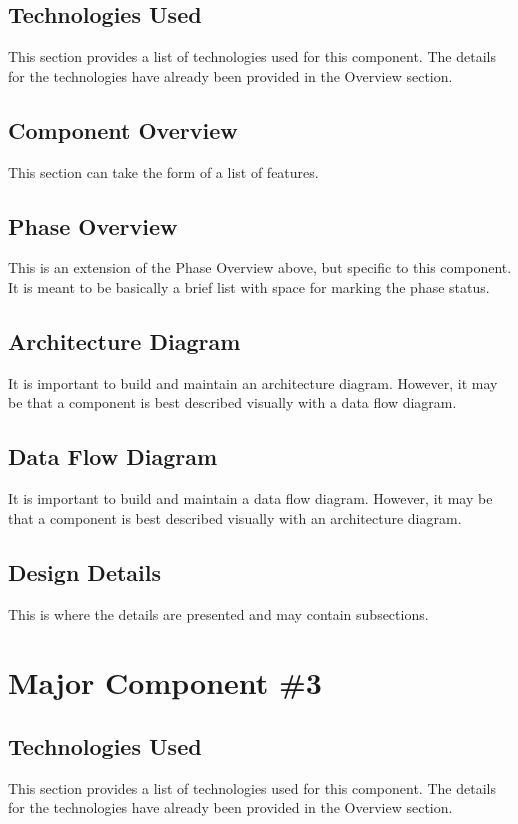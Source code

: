 \subsection{Technologies  Used}
This section provides a list of technologies used for this component.  The details 
for the technologies have already been provided in the Overview section. 

\subsection{Component  Overview}
This section can take the form of a list of features. 

\subsection{Phase Overview}
This is an extension of the Phase Overview above, but specific to this component. 
 It is meant to be basically a brief list with space for marking the phase status. 

\subsection{ Architecture  Diagram}
It is important to build and maintain an architecture diagram.  However, it may 
be that a component is best described visually with a data flow diagram. 


\subsection{Data Flow Diagram}
It is important to build and maintain a data flow diagram.  However, it may be 
that a component is best described visually with an architecture diagram. 


\subsection{Design Details}
This is where the details are presented and may contain subsections. 


\section{Major Component \#3 }

\subsection{Technologies  Used}
This section provides a list of technologies used for this component.  The details 
for the technologies have already been provided in the Overview section. 

